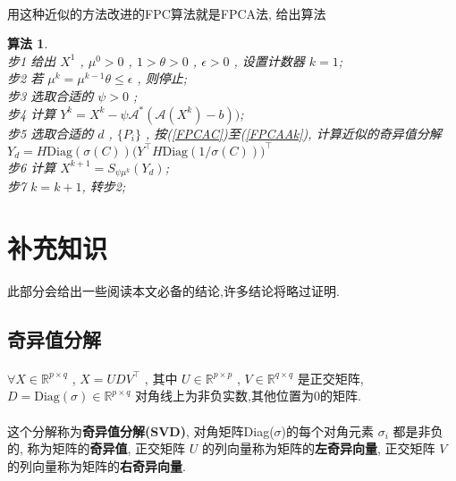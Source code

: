 \documentclass[UTF8]{ctexart}
\newtheorem{algo}{\bf 算法}
\begin{document}
			\paragraph{}
				\quad 用这种近似的方法改进的FPC算法就是FPCA法, 给出算法
				\begin{algo}
					\quad\\
					步1 \quad 给出 $X^1$ , $\mu^0 > 0$ , $1 > \theta > 0$ , $\epsilon > 0$ , 设置计数器 $k = 1$;\\
					步2 \quad 若 $\mu^k = \mu^{k -1} \theta \le \epsilon$ , 则停止;\\
					步3 \quad 选取合适的 $\psi > 0$ ;\\
					步4 \quad 计算 $Y^k = X^k - \psi \mathcal{A}^*(\mathcal{A}(X^k) - b))$;\\
					步5 \quad 选取合适的 $d$ , $\{P_i\}$ , 按(\ref{FPCAC})至(\ref{FPCAAk}), 计算近似的奇异值分解 $Y_d = H \text{Diag}(\sigma(C)) \big(Y ^\top H \text{Diag}(1/\sigma(C))\big)^\top$\\
					步6 \quad 计算 $X^{k + 1} = S_{\psi \mu^k}(Y_d)$;\\
					步7 \quad $k = k + 1$, 转步2;
				\end{algo}
		


		
	\section{补充知识}
		此部分会给出一些阅读本文必备的结论,许多结论将略过证明.
		\subsection{奇异值分解}
			\paragraph{}
				\quad $\forall X \in \mathbb{R}^{p \times q}$ , $X = U D V^\top$ , 其中 $U \in \mathbb{R}^{p \times p}$ , $V \in \mathbb{R}^{q \times q}$ 是正交矩阵, $ D = \text{Diag}(\sigma) \in \mathbb{R}^{p \times q}$ 对角线上为非负实数,其他位置为0的矩阵.

			\paragraph{}
				\quad 这个分解称为\textbf{奇异值分解(SVD)}, 对角矩阵Diag($\sigma$)的每个对角元素 $\sigma_i$ 都是非负的, 称为矩阵的\textbf{奇异值}, 正交矩阵 $U$ 的列向量称为矩阵的\textbf{左奇异向量}, 正交矩阵 $V$ 的列向量称为矩阵的\textbf{右奇异向量}.
\end{document}
